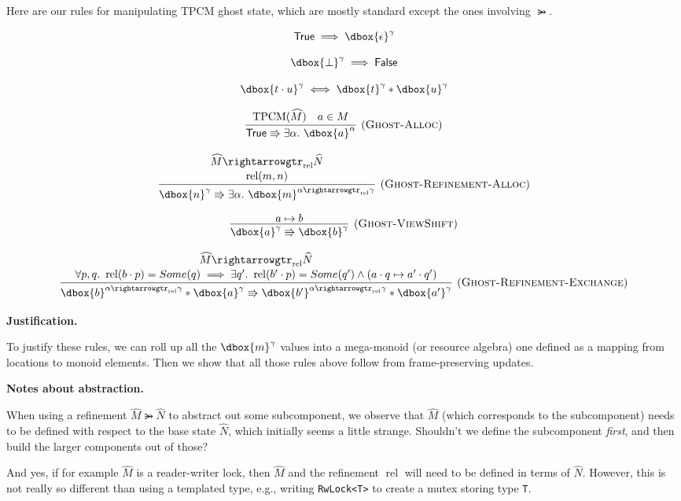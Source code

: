 \documentclass{article}
\newcommand{\einfer}[3]
        {\infer[(\textsc{#1})]{#3}{#2}}
\newcommand{\stacktwo}[2]{\stackanchor{\ensuremath{#1}}{\ensuremath{#2}}}
\newcommand\dboxed[1]{\dbox{\vphantom{t}\ensuremath{#1}}}
\newcommand{\viewshift}{\Rrightarrow}
\newcommand{\unit}{\epsilon}
\newcommand{\true}{\textsf{True}}
\newcommand{\false}{\textsf{False}}
\DeclareMathOperator{\rel}{rel}
\DeclareMathOperator{\TPCM}{TPCM}
\newcommand{\refines}{\rightarrowgtr}
\begin{document}
Here are our rules for manipulating TPCM ghost state, which are mostly standard except
the ones involving $\refines$.

\[
  \true \implies \dboxed{\unit}^\gamma
\]

\[
  \dboxed{\bot}^\gamma \implies \false
\]

\[
  \dboxed{t\cdot u}^\gamma\iff\dboxed{t}^\gamma * \dboxed{u}^\gamma
\]

\[
  \einfer{Ghost-Alloc}{
    \TPCM(\widehat{M}) \quad a\in M
  }{
    \true \viewshift \exists\alpha.~ \dboxed{a}^\alpha
  }
\]

\[
  \einfer{Ghost-Refinement-Alloc}{
    \stacktwo{
      \widehat{M} \refines_{\rel} \widehat{N}
    }{
      \rel(m, n)
    }
  }{
    \dboxed{n}^\gamma \viewshift \exists \alpha.~ \dboxed{m}^{\alpha \refines_{\rel} \gamma}
  }
\]

\[
  \einfer{Ghost-ViewShift}{
    a \mapsto b
  }{
    \dboxed{a}^\gamma \viewshift \dboxed{b}^\gamma
  }
\]

\[
  \einfer{Ghost-Refinement-Exchange}{
    \stacktwo{
      \widehat{M} \refines_{\rel} \widehat{N}
    }{
      \forall p,q.~ \rel(b\cdot p) = Some(q) \implies \exists q' .~ \rel(b' \cdot p) = Some(q') \land (a \cdot q \mapsto a' \cdot q')
    }
  }{
    \dboxed{b}^{\alpha \refines_{\rel} \gamma} * \dboxed{a}^\gamma
      \viewshift
    \dboxed{b'}^{\alpha \refines_{\rel} \gamma} * \dboxed{a'}^\gamma
  }
\]

\textbf{Justification.}

To justify these rules, we can roll up all the $\dboxed{m}^\gamma$ values into a mega-monoid (or resource algebra)
one defined as a mapping from locations to monoid elements.
Then we show that all those rules above follow from frame-preserving updates.

\textbf{Notes about abstraction.}

When using a refinement
$\widehat{M} \refines \widehat{N}$
to abstract out some subcomponent, we observe that $\widehat{M}$ (which corresponds to the subcomponent) needs to be defined with respect to the base state $\widehat{N}$,
which initially seems a little strange. Shouldn't we define the subcomponent \emph{first}, and then build the larger components out of those?

And yes, if for example $\widehat{M}$ is a reader-writer lock, then $\widehat{M}$ and the refinement $\rel$ will need to be defined in terms of $\widehat{N}$. However, this is not really so different than using a templated type, e.g., writing \texttt{RwLock<T>} to create a mutex storing type \texttt{T}.
\end{document}
